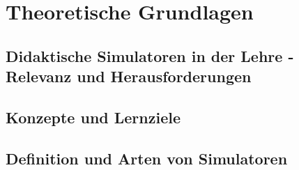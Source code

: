\chapter{Theoretische Grundlagen}

\section{Didaktische Simulatoren in der Lehre - Relevanz und Herausforderungen}

\section{Konzepte und Lernziele}

\section{Definition und Arten von Simulatoren}